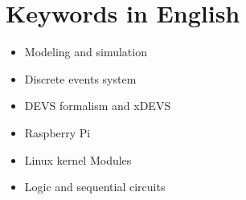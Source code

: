 \documentclass[a4paper,11pt]{book}
\begin{document}
\section*{Keywords in English}
\begin{itemize}
\item Modeling and simulation
\item Discrete events system
\item DEVS formalism and xDEVS
\item Raspberry Pi
\item Linux kernel Modules
\item Logic and sequential circuits
\end{itemize}







\end{document}
